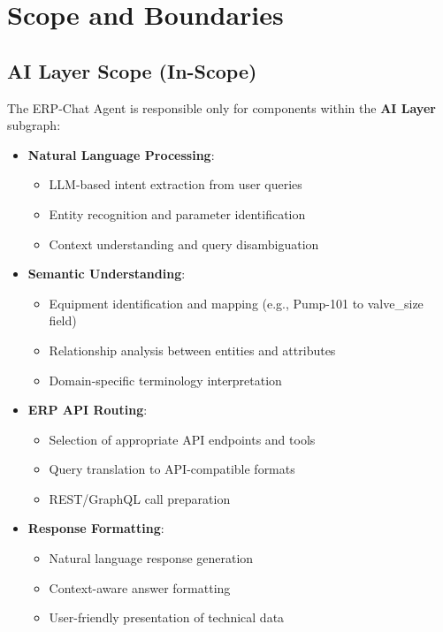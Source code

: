 \documentclass[12pt]{report}
\begin{document}
\section{Scope and Boundaries}
\subsection{AI Layer Scope (In-Scope)}
The ERP-Chat Agent is responsible only for components within the \textbf{AI Layer} subgraph:
\begin{itemize}
  \item \textbf{Natural Language Processing}: 
    \begin{itemize}
      \item LLM-based intent extraction from user queries
      \item Entity recognition and parameter identification
      \item Context understanding and query disambiguation
    \end{itemize}
  \item \textbf{Semantic Understanding}:
    \begin{itemize}
      \item Equipment identification and mapping (e.g., Pump-101 to valve\_size field)
      \item Relationship analysis between entities and attributes
      \item Domain-specific terminology interpretation
    \end{itemize}
  \item \textbf{ERP API Routing}:
    \begin{itemize}
      \item Selection of appropriate API endpoints and tools
      \item Query translation to API-compatible formats
      \item REST/GraphQL call preparation
    \end{itemize}
  \item \textbf{Response Formatting}:
    \begin{itemize}
      \item Natural language response generation
      \item Context-aware answer formatting
      \item User-friendly presentation of technical data
    \end{itemize}
\end{itemize}
\end{document}
